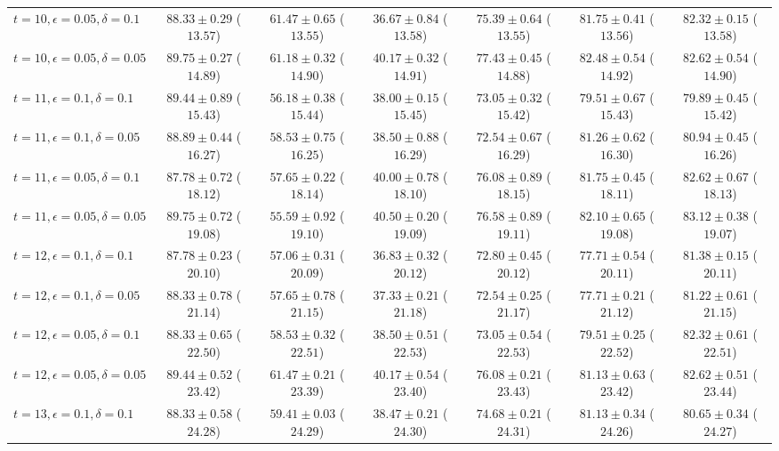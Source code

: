 \documentclass[journal]{IEEEtran}
\theoremstyle{definition}
\begin{document}
\begin{table*}[!t]
\begin{center}
{\begin{tabular}{|l|c|c|c|c|c|c|}
$t=10, \epsilon = 0.05, \delta = 0.1$  & $88.33 \pm 0.29$ ($13.57$) & $61.47 \pm 0.65$ ($13.55$) & $36.67 \pm 0.84$ ($13.58$) & $75.39 \pm 0.64$ ($13.55$) & $81.75 \pm 0.41$ ($13.56$) & $82.32 \pm 0.15$ ($13.58$) \\
$t=10, \epsilon = 0.05, \delta = 0.05$ & $89.75 \pm 0.27$ ($14.89$) & $61.18 \pm 0.32$ ($14.90$) & $40.17 \pm 0.32$ ($14.91$) & $77.43 \pm 0.45$ ($14.88$) & $82.48 \pm 0.54$ ($14.92$) & $82.62 \pm 0.54$ ($14.90$) \\
\hline
$t=11, \epsilon = 0.1, \delta = 0.1$   & $89.44 \pm 0.89$ ($15.43$) & $56.18 \pm 0.38$ ($15.44$) & $38.00 \pm 0.15$ ($15.45$) & $73.05 \pm 0.32$ ($15.42$) & $79.51 \pm 0.67$ ($15.43$) & $79.89 \pm 0.45$ ($15.42$) \\
$t=11, \epsilon = 0.1, \delta = 0.05$  & $88.89 \pm 0.44$ ($16.27$) & $58.53 \pm 0.75$ ($16.25$) & $38.50 \pm 0.88$ ($16.29$) & $72.54 \pm 0.67$ ($16.29$) & $81.26 \pm 0.62$ ($16.30$) & $80.94 \pm 0.45$ ($16.26$) \\
$t=11, \epsilon = 0.05, \delta = 0.1$  & $87.78 \pm 0.72$ ($18.12$) & $57.65 \pm 0.22$ ($18.14$) & $40.00 \pm 0.78$ ($18.10$) & $76.08 \pm 0.89$ ($18.15$) & $81.75 \pm 0.45$ ($18.11$) & $82.62 \pm 0.67$ ($18.13$) \\
$t=11, \epsilon = 0.05, \delta = 0.05$ & $89.75 \pm 0.72$ ($19.08$) & $55.59 \pm 0.92$ ($19.10$) & $40.50 \pm 0.20$ ($19.09$) & $76.58 \pm 0.89$ ($19.11$) & $82.10 \pm 0.65$ ($19.08$) & $83.12 \pm 0.38$ ($19.07$) \\
\hline
$t=12, \epsilon = 0.1, \delta = 0.1$   & $87.78 \pm 0.23$ ($20.10$) & $57.06 \pm 0.31$ ($20.09$) & $36.83 \pm 0.32$ ($20.12$) & $72.80 \pm 0.45$ ($20.12$) & $77.71 \pm 0.54$ ($20.11$) & $81.38 \pm 0.15$ ($20.11$) \\
$t=12, \epsilon = 0.1, \delta = 0.05$  & $88.33 \pm 0.78$ ($21.14$) & $57.65 \pm 0.78$ ($21.15$) & $37.33 \pm 0.21$ ($21.18$) & $72.54 \pm 0.25$ ($21.17$) & $77.71 \pm 0.21$ ($21.12$) & $81.22 \pm 0.61$ ($21.15$) \\
$t=12, \epsilon = 0.05, \delta = 0.1$  & $88.33 \pm 0.65$ ($22.50$) & $58.53 \pm 0.32$ ($22.51$) & $38.50 \pm 0.51$ ($22.53$) & $73.05 \pm 0.54$ ($22.53$) & $79.51 \pm 0.25$ ($22.52$) & $82.32 \pm 0.61$ ($22.51$) \\
$t=12, \epsilon = 0.05, \delta = 0.05$ & $89.44 \pm 0.52$ ($23.42$) & $61.47 \pm 0.21$ ($23.39$) & $40.17 \pm 0.54$ ($23.40$) & $76.08 \pm 0.21$ ($23.43$) & $81.13 \pm 0.63$ ($23.42$) & $82.62 \pm 0.51$ ($23.44$) \\
\hline
$t=13, \epsilon = 0.1, \delta = 0.1$   & $88.33 \pm 0.58$ ($24.28$) & $59.41 \pm 0.03$ ($24.29$) & $38.47 \pm 0.21$ ($24.30$) & $74.68 \pm 0.21$ ($24.31$) & $81.13 \pm 0.34$ ($24.26$) & $80.65 \pm 0.34$ ($24.27$) \\

\end{tabular}}
\end{center}
\end{table*}
\end{document}
